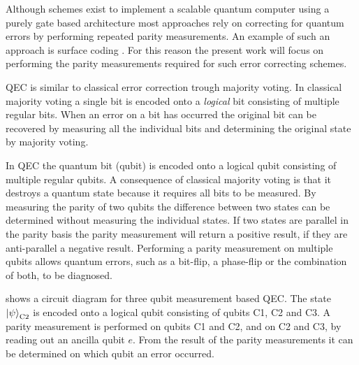 Although schemes exist to implement a scalable quantum computer using a purely gate based architecture most approaches rely on correcting for quantum errors by performing repeated parity measurements. An example of such an approach is surface coding \citep{Fowler2012Surface}.
For this reason the present work will focus on performing the parity measurements required for such error correcting schemes.

QEC is similar to classical error correction trough majority voting.
In classical majority voting a single bit is encoded onto a \emph{logical} bit consisting of multiple regular bits.
When an error on a bit has occurred the original bit can be recovered by measuring all the individual bits and determining the original state by majority voting.

In QEC the quantum bit (qubit) is encoded onto a logical qubit consisting of multiple regular qubits.
A consequence of classical majority voting is that it destroys a quantum state because it requires all bits to be measured.
By measuring the parity of two qubits the difference between two states can be determined without measuring the individual states.
If two states are parallel in the parity basis the parity measurement will return a positive result, if they are anti-parallel a negative result.
Performing a parity measurement on multiple qubits allows quantum errors, such as a bit-flip, a phase-flip or the combination of both, to be diagnosed.

 shows a circuit diagram for three qubit measurement based QEC.
The state ${\left\vert{\psi}\right\rangle}_\mathrm{C2}$ is encoded onto a logical qubit consisting of qubits C1, C2 and C3.
A parity measurement is performed on qubits C1 and C2, and on C2 and C3,  by reading out an ancilla qubit $e$.
From the result of the parity measurements it can be determined on which qubit an error occurred.

